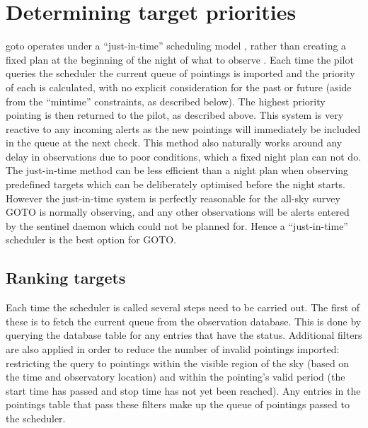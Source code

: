 \section{Determining target priorities}
\label{sec:priorities}
\begin{colsection}


\begin{colsection}

\gls{goto} operates under a ``just-in-time'' scheduling model \citep[see, for example,][]{LCO_scheduling}, rather than creating a fixed plan at the beginning of the night of what to observe \citep[see, for example,][]{ZTF_scheduler}. Each time the pilot queries the scheduler the current queue of pointings is imported and the priority of each is calculated, with no explicit consideration for the past or future (aside from the ``mintime'' constraints, as described below). The highest priority pointing is then returned to the pilot, as described above. This system is very reactive to any incoming alerts as the new pointings will immediately be included in the queue at the next check. This method also naturally works around any delay in observations due to poor conditions, which a fixed night plan can not do. The just-in-time method can be less efficient than a night plan when observing predefined targets which can be deliberately optimised before the night starts. However the just-in-time system is perfectly reasonable for the all-sky survey GOTO is normally observing, and any other observations will be alerts entered by the sentinel daemon which could not be planned for. Hence a ``just-in-time'' scheduler is the best option for GOTO.\@

\end{colsection}

\subsection{Ranking targets}
\label{sec:rank}
\begin{colsection}

Each time the scheduler is called several steps need to be carried out. The first of these is to fetch the current queue from the observation database. This is done by querying the database  table for any entries that have the  status. Additional filters are also applied in order to reduce the number of invalid pointings imported: restricting the query to pointings within the visible region of the sky (based on the time and observatory location) and within the pointing's valid period (the start time has passed and stop time has not yet been reached). Any entries in the pointings table that pass these filters make up the queue of pointings passed to the scheduler.


\end{colsection}
\end{colsection}
